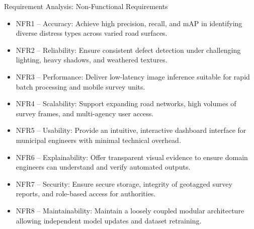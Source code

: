 \documentclass[10pt]{beamer}
\def\textbf#1{#1}%
\def\begin#1{}%
\def\end#1{}%
\begin{document}
\begin{frame}{Requirement Analysis: Non-Functional Requirements}
    \begin{itemize}
        \setlength{\itemsep}{0.48em}
        \item \textbf{NFR1 -- Accuracy:} Achieve high precision, recall, and mAP in identifying diverse distress types across varied road surfaces.
        \item \textbf{NFR2 -- Reliability:} Ensure consistent defect detection under challenging lighting, heavy shadows, and weathered textures.
        \item \textbf{NFR3 -- Performance:} Deliver low-latency image inference suitable for rapid batch processing and mobile survey units.
        \item \textbf{NFR4 -- Scalability:} Support expanding road networks, high volumes of survey frames, and multi-agency user access.
        \item \textbf{NFR5 -- Usability:} Provide an intuitive, interactive dashboard interface for municipal engineers with minimal technical overhead.
        \item \textbf{NFR6 -- Explainability:} Offer transparent visual evidence to ensure domain engineers can understand and verify automated outputs.
        \item \textbf{NFR7 -- Security:} Ensure secure storage, integrity of geotagged survey reports, and role-based access for authorities.
        \item \textbf{NFR8 -- Maintainability:} Maintain a loosely coupled modular architecture allowing independent model updates and dataset retraining.
    \end{itemize}
\end{frame}
\end{document}
